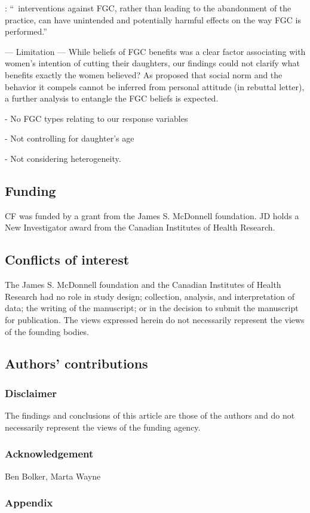 \documentclass[12pt,]{article}
\begin{document}
\cite{Cami15}: “ interventions against FGC, rather than leading to the abandonment of the practice, can have unintended and potentially harmful effects on the way FGC is performed.”


— Limitation —
While beliefs of FGC benefits was a clear factor associating with women’s intention of cutting their daughters, our findings could not clarify what benefits exactly the women believed?  As proposed that social norm and the behavior it compels cannot be inferred from personal attitude \cite{Mack18} (in rebuttal letter), a further analysis to entangle the FGC beliefs is expected.

- No FGC types relating to our response variables

- Not controlling for daughter’s age

- Not considering heterogeneity.

\subsection{Funding}\label{Funding}

CF was funded by a grant from the James S. McDonnell foundation. JD holds a New Investigator award from the Canadian Institutes of Health Research.

\subsection{Conflicts of interest}\label{Conflicts-of-Interest}

The James S. McDonnell foundation and the Canadian Institutes of Health Research had no role in study design; collection, analysis, and interpretation of data; the writing of the manuscript; or in the decision to submit the manuscript for publication.  The views expressed herein do not necessarily represent the views of the founding bodies.

\subsection{Authors' contributions}\label{Authors'-contributions}

\subsubsection{Disclaimer}\label{disclaimer}

The findings and conclusions of this article are those of the authors
and do not necessarily represent the views of the funding agency.

\subsubsection{Acknowledgement}\label{Acknowledgement}
Ben Bolker,  Marta Wayne

\subsubsection{Appendix}\label{appendix-1}


\end{document}
